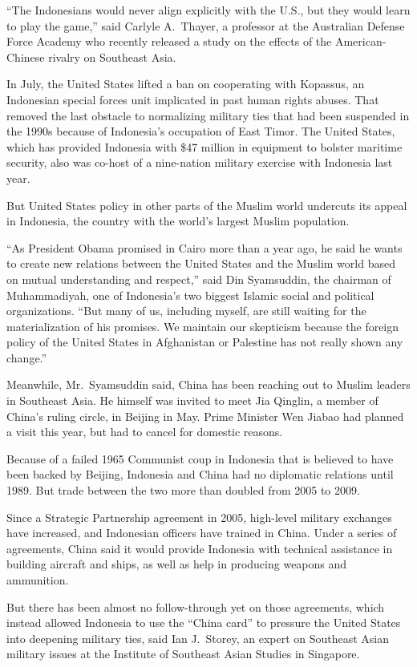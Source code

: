 ﻿\documentclass[12pt]{article}
\begin{document}
``The Indonesians would never align explicitly with the U.S., but they would learn to play the
game,'' said Carlyle A.~Thayer, a professor at the Australian Defense Force Academy who recently
released a study on the effects of the American-Chinese rivalry on Southeast Asia.

In July, the United States lifted a ban on cooperating with Kopassus, an Indonesian special forces
unit implicated in past human rights abuses. That removed the last obstacle to normalizing military
ties that had been suspended in the 1990s because of Indonesia's occupation of East Timor. The
United States, which has provided Indonesia with \$47 million in equipment to bolster maritime
security, also was co-host of a nine-nation military exercise with Indonesia last year.

But United States policy in other parts of the Muslim world undercuts its appeal in Indonesia, the
country with the world's largest Muslim population.

``As President Obama promised in Cairo more than a year ago, he said he wants to create new
relations between the United States and the Muslim world based on mutual understanding and
respect,'' said Din Syamsuddin, the chairman of Muhammadiyah, one of Indonesia's two biggest Islamic
social and political organizations. ``But many of us, including myself, are still waiting for the
materialization of his promises. We maintain our skepticism because the foreign policy of the United
States in Afghanistan or Palestine has not really shown any change.''

Meanwhile, Mr.~Syamsuddin said, China has been reaching out to Muslim leaders in Southeast Asia. He
himself was invited to meet Jia Qinglin, a member of China's ruling circle, in Beijing in May. Prime
Minister Wen Jiabao had planned a visit this year, but had to cancel for domestic reasons.

Because of a failed 1965 Communist coup in Indonesia that is believed to have been backed by
Beijing, Indonesia and China had no diplomatic relations until 1989. But trade between the two more
than doubled from 2005 to 2009.

Since a Strategic Partnership agreement in 2005, high-level military exchanges have increased, and
Indonesian officers have trained in China. Under a series of agreements, China said it would provide
Indonesia with technical assistance in building aircraft and ships, as well as help in producing
weapons and ammunition.

But there has been almost no follow-through yet on those agreements, which instead allowed Indonesia
to use the ``China card'' to pressure the United States into deepening military ties, said Ian
J.~Storey, an expert on Southeast Asian military issues at the Institute of Southeast Asian Studies
in Singapore.
\end{document}

